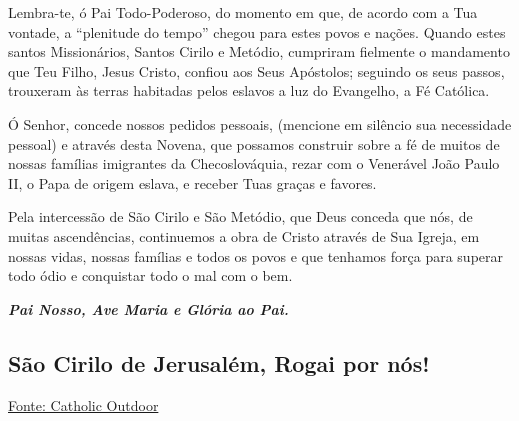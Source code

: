 \documentclass[18pt]{article}
\begin{document}
\begin{justify}
Lembra-te, ó Pai Todo-Poderoso, do momento em que,  
de acordo com a Tua vontade,  
a “plenitude do tempo” chegou para estes povos e nações.  
Quando estes santos Missionários,  
Santos Cirilo e Metódio,  
cumpriram fielmente o mandamento que Teu Filho, Jesus Cristo,  
confiou aos Seus Apóstolos;  
seguindo os seus passos,  
trouxeram às terras habitadas pelos eslavos  
a luz do Evangelho, a Fé Católica.

Ó Senhor, concede nossos pedidos pessoais,  
(mencione em silêncio sua necessidade pessoal)  
e através desta Novena,  
que possamos construir sobre a fé de muitos  
de nossas famílias imigrantes da Checoslováquia,  
rezar com o Venerável João Paulo II,  
o Papa de origem eslava,  
e receber Tuas graças e favores.

Pela intercessão de São Cirilo e São Metódio,  
que Deus conceda que nós, de muitas ascendências,  
continuemos a obra de Cristo através de Sua Igreja,  
em nossas vidas, nossas famílias e todos os povos  
e que tenhamos força para superar todo ódio  
e conquistar todo o mal com o bem.




\begin{center}
\textbf{\textit{Pai Nosso, Ave Maria e Glória ao Pai.}}
\end{center}

\vfill

\begin{center}
\section*{São Cirilo de Jerusalém, Rogai por nós!}
\end{center}

\href{https://www.catholicdoors.com/prayers/novenas/p03972.htm}{Fonte: Catholic Outdoor}

\vfill


\end{justify}
\end{document}
